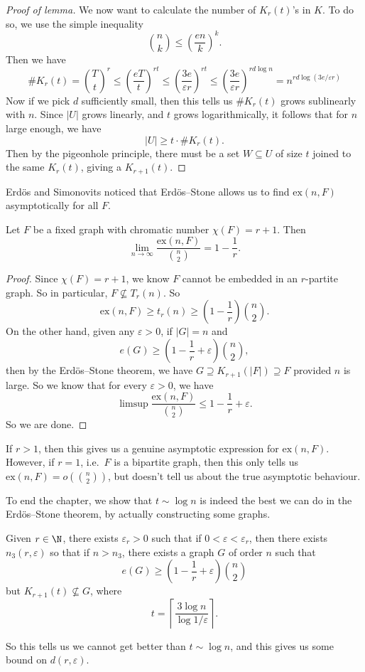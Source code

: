 \documentclass[a4paper]{article}
\renewcommand\ex{\mathrm{ex}}
\begin{document}
\begin{proof}[Proof of lemma]
  We now want to calculate the number of $K_r(t)$'s in $K$. To do so, we use the simple inequality
  \[
    \binom{n}{k} \leq \left(\frac{e n}{k}\right)^k.
  \]
  Then we have
  \[
    \# K_r(t) = \binom{T}{t}^r \leq \left(\frac{eT}{t}\right)^{rt} \leq \left(\frac{3e}{\varepsilon r}\right)^{rt} \leq \left(\frac{3e}{\varepsilon r}\right)^{rd\log n} = n^{rd \log (3e/\varepsilon r)}%
  \]
  Now if we pick $d$ sufficiently small, then this tells us $\#K_r(t)$ grows sublinearly with $n$. Since $|U|$ grows linearly, and $t$ grows logarithmically, it follows that for $n$ large enough, we have
  \[
    |U| \geq t\cdot \# K_r(t).
  \]
  Then by the pigeonhole principle, there must be a set $W \subseteq U$ of size $t$ joined to the same $K_r(t)$, giving a $K_{r + 1}(t)$.
\end{proof}

Erd\"os and Simonovits noticed that Erd\"os--Stone allows us to find $\ex(n, F)$ asymptotically for all $F$.

\begin{thm}
  Let $F$ be a fixed graph with chromatic number $\chi(F) = r + 1$. Then
  \[
    \lim_{n \to \infty} \frac{\ex(n, F)}{\binom{n}{2}} = 1 - \frac{1}{r}.
  \]
\end{thm}

\begin{proof}
  Since $\chi(F) = r + 1$, we know $F$ cannot be embedded in an $r$-partite graph. So in particular, $F \not\subseteq T_r(n)$. So
  \[
    \ex(n, F) \geq t_r(n) \geq \left(1 - \frac{1}{r}\right)\binom{n}{2}.
  \]
  On the other hand, given any $\varepsilon > 0$, if $|G| = n$ and
  \[
    e(G) \geq \left(1 - \frac{1}{r} + \varepsilon\right) \binom{n}{2},
  \]
  then by the Erd\"os--Stone theorem, we have $G \supseteq K_{r + 1}(|F|) \supseteq F$ provided $n$ is large. So we know that for every $\varepsilon > 0$, we have
  \[
    \limsup \frac{\ex(n, F)}{\binom{n}{2}} \leq 1 - \frac{1}{r} + \varepsilon.
  \]
  So we are done.
\end{proof}
If $r > 1$, then this gives us a genuine asymptotic expression for $\ex(n, F)$. However, if $r = 1$, i.e.\ $F$ is a bipartite graph, then this only tells us $\ex(n, F) = o\left(\binom{n}{2}\right)$, but doesn't tell us about the true asymptotic behaviour.

To end the chapter, we show that $t \sim \log n$ is indeed the best we can do in the Erd\"os--Stone theorem, by actually constructing some graphs.
\begin{thm}
  Given $r \in \N$, there exists $\varepsilon_r > 0$ such that if $0 < \varepsilon < \varepsilon_r$, then there exists $n_3(r, \varepsilon)$ so that if $n > n_3$, there exists a graph $G$ of order $n$ such that
  \[
    e(G) \geq \left(1 - \frac{1}{r} + \varepsilon\right) \binom{n}{2}
  \]
  but $K_{r + 1}(t) \not\subseteq G$, where
  \[
    t = \left\lceil \frac{3 \log n}{\log 1/\varepsilon}\right\rceil.
  \]
\end{thm}
So this tells us we cannot get better than $t \sim \log n$, and this gives us some bound on $d(r, \varepsilon)$.
\end{document}
